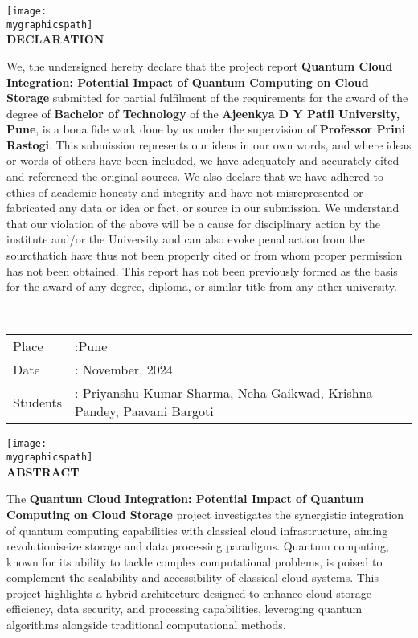 \documentclass[12pt,a4paper]{article}
\newcommand{\mygraphicspath}{D:/SEM-5/FSDC/quantum-cloud-integration/images/ADYPU_LOGO.png}
\newcommand{\vname}{Priyanshu Kumar Sharma, Neha Gaikwad, Krishna Pandey, Paavani Bargoti}
\newcommand{\vdate}{November, 2024}
\newcommand{\vtitle}{Quantum Cloud Integration: Potential Impact of Quantum Computing on Cloud Storage}
\newcommand{\vguide}{Professor Prini Rastogi}
\begin{document}
\begin{center}
    \texttt{[image: \\mygraphicspath]}\\[2cm]
    \fontsize{14}{16}\selectfont \bfseries
    DECLARATION
    \end{center}
    We, the undersigned hereby declare that the project report 
    {\bfseries \vtitle} submitted for
    partial fulfilment of the requirements for the award of the degree of \textbf{Bachelor of Technology} of
    the \textbf{Ajeenkya D Y Patil University, Pune}, is a bona fide work done by us
    under the supervision of \textbf{\vguide}. This submission represents our ideas in
    our own words, and where ideas or words of others have been included, we have adequately
    and accurately cited and referenced the original sources. We also declare that we have
    adhered to ethics of academic honesty and integrity and have not misrepresented or
    fabricated any data or idea or fact, or source in our submission. We understand that our
    violation of the above will be a cause for disciplinary action by the institute and/or the
    University and can also evoke penal action from the sourcthatich have thus not been
    properly cited or from whom proper permission has not been obtained. This report has
    not been previously formed as the basis for the award of any degree, diploma, or similar title
    from any other university. 
    
    \qquad\\[1cm]
    \begin{tabular}{llll}
    Place&:\enspace Pune\qquad  \\
    Date&: \vdate \\
    Students&: \vname
    \end{tabular}

\newpage



\begin{center}
    \texttt{[image: \\mygraphicspath]}\\[2cm]
    \fontsize{14}{16}\selectfont \bfseries
    ABSTRACT
    \end{center}

The \textbf{Quantum Cloud Integration: Potential Impact of Quantum Computing on Cloud Storage} project investigates the synergistic integration of quantum computing capabilities with classical cloud infrastructure, aiming revolutioniseize storage and data processing paradigms. Quantum computing, known for its ability to tackle complex computational problems, is poised to complement the scalability and accessibility of classical cloud systems. This project highlights a hybrid architecture designed to enhance cloud storage efficiency, data security, and processing capabilities, leveraging quantum algorithms alongside traditional computational methods.  
\end{document}
